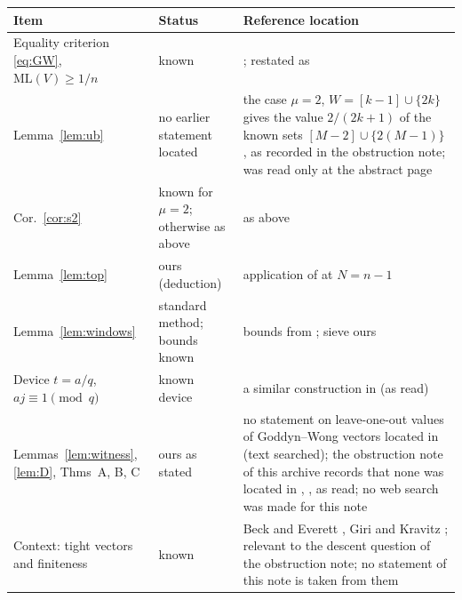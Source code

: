 \documentclass[11pt]{article}
\theoremstyle{remark}
\newcommand{\ML}{\mathrm{ML}}
\begin{document}
\begin{center}\footnotesize
\begin{tabular}{@{}L{3.3cm}L{1.9cm}L{6.1cm}@{}}
\toprule
Item & Status & Reference location\\
\midrule
Equality criterion \eqref{eq:GW}, $\ML(V)\ge1/n$ & known & \cite[Thm.~2.3, p.~4]{GW06}; restated as \cite[Thm.~1.1]{Zhang26}\\
Lemma~\ref{lem:ub} & no earlier statement located & the case $\mu=2$, $W=[k-1]\cup\{2k\}$ gives the value $2/(2k+1)$ of the known sets $[M-2]\cup\{2(M-1)\}$ \cite[Thm.~5.1]{Kravitz21}, as recorded in the obstruction note; \cite{Kravitz21} was read only at the abstract page\\
Cor.~\ref{cor:s2} & known for $\mu=2$; otherwise as above & as above\\
Lemma~\ref{lem:top} & ours (deduction) & application of \cite[Thm.~2.3]{GW06} at $N=n-1$\\
Lemma~\ref{lem:windows} & standard method; bounds known & bounds from \cite[Thm.~6.9]{Dusart10}; sieve ours\\
Device $t=a/q$, $aj\equiv1\pmod q$ & known device & a similar construction in \cite[Thm.~2.9]{Zhang26} (as read)\\
Lemmas~\ref{lem:witness}, \ref{lem:D}, Thms~A, B, C & ours as stated & no statement on leave-one-out values of Goddyn--Wong vectors located in \cite{Zhang26} (text searched); the obstruction note of this archive records that none was located in \cite{GK25}, \cite{BE26}, \cite{Zhang26} as read; no web search was made for this note\\
Context: tight vectors and finiteness & known & Beck and Everett \cite{BE26}, Giri and Kravitz \cite{GK25}; relevant to the descent question of the obstruction note; no statement of this note is taken from them\\
\bottomrule
\end{tabular}
\end{center}



\end{document}
